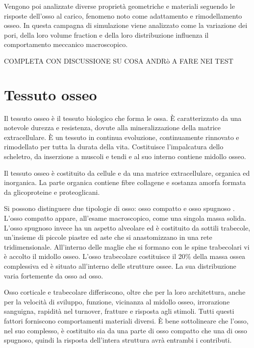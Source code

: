 \documentclass[a4paper,num-refs]{oup-contemporary}
\begin{document}
Vengono poi analizzate diverse proprietà geometriche e materiali seguendo le risposte dell'osso al carico, fenomeno noto come adattamento e rimodellamento osseo. In questa campagna di simulazione viene analizzato come la variazione dei pori, della loro volume fraction e della loro distribuzione influenza il comportamento meccanico macroscopico. 



COMPLETA CON DISCUSSIONE SU COSA ANDRò A FARE NEI TEST 



\section{Tessuto osseo}

Il tessuto osseo è il tessuto biologico che forma le ossa. È caratterizzato da una notevole durezza e resistenza, dovute alla mineralizzazione della matrice extracellulare. È un tessuto in continua evoluzione, continuamente rinnovato e rimodellato per tutta la durata della vita. Costituisce l'impalcatura dello scheletro, da inserzione a muscoli e tendi e al suo interno contiene midollo osseo. 

Il tessuto osseo è costituito da cellule e da una matrice extracellulare, organica ed inorganica. La parte organica contiene fibre collagene e sostanza amorfa formata da glicoproteine e proteoglicani. 

Si possono distinguere due tipologie di osso: osso compatto e osso spugnoso \citep{Monesi}. 
L'osso compatto appare, all'esame macroscopico, come una singola massa solida. L'osso spugnoso invece ha un aspetto alveolare ed è costituito da sottili trabecole, un'insieme di piccole piastre ed aste che si anastomizzano in una rete tridimensionale. All'interno delle maglie che si formano con le spine trabecolari vi è accolto il midollo osseo. L'osso trabecolare costituisce il 20\% della massa ossea complessiva ed è situato all'interno delle strutture ossee. La sua distribuzione varia fortemente da osso ad osso. 

Osso corticale e trabecolare differiscono, oltre che per la loro architettura, anche per la velocità di sviluppo, funzione, vicinanza al midollo osseo, irrorazione sanguigna, rapidità nel turnover, fratture e risposta agli stimoli. Tutti questi fattori forniscono comportamenti materiali diversi. 
È bene sottolineare che l'osso, nel suo complesso, è costituito sia da una parte di osso compatto che una di osso spugnoso, quindi la risposta dell'intera struttura avrà entrambi i contributi. 
\end{document}
